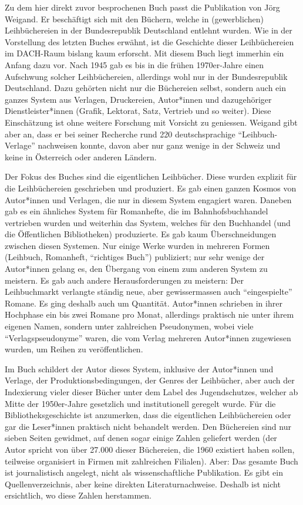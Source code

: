 \documentclass[a4paper,
fontsize=11pt,
oneside,
numbers=noperiodatend,
parskip=half-,
bibliography=totoc,
final
]{scrartcl}
\begin{document}
Zu dem hier direkt zuvor besprochenen Buch passt die Publikation von
Jörg Weigand. Er beschäftigt sich mit den Büchern, welche in
(gewerblichen) Leihbüchereien in der Bundesrepublik Deutschland entlehnt
wurden. Wie in der Vorstellung des letzten Buches erwähnt, ist die
Geschichte dieser Leihbüchereien im DACH-Raum bislang kaum erforscht.
Mit diesem Buch liegt immerhin ein Anfang dazu vor. Nach 1945 gab es bis
in die frühen 1970er-Jahre einen Aufschwung solcher Leihbüchereien,
allerdings wohl nur in der Bundesrepublik Deutschland. Dazu gehörten
nicht nur die Büchereien selbst, sondern auch ein ganzes System aus
Verlagen, Druckereien, Autor*innen und dazugehöriger Dienstleister*innen
(Grafik, Lektorat, Satz, Vertrieb und so weiter). Diese Einschätzung ist
ohne weitere Forschung mit Vorsicht zu geniessen. Weigand gibt aber an,
dass er bei seiner Recherche rund 220 deutschsprachige
\enquote{Leihbuch-Verlage} nachweisen konnte, davon aber nur ganz wenige
in der Schweiz und keine in Österreich oder anderen Ländern.

Der Fokus des Buches sind die eigentlichen Leihbücher. Diese wurden
explizit für die Leihbüchereien geschrieben und produziert. Es gab einen
ganzen Kosmos von Autor*innen und Verlagen, die nur in diesem System
engagiert waren. Daneben gab es ein ähnliches System für Romanhefte, die
im Bahnhofsbuchhandel vertrieben wurden und weiterhin das System,
welches für den Buchhandel (und die Öffentlichen Bibliotheken)
produzierte. Es gab kaum Überschneidungen zwischen diesen Systemen. Nur
einige Werke wurden in mehreren Formen (Leihbuch, Romanheft,
\enquote{richtiges Buch}) publiziert; nur sehr wenige der Autor*innen
gelang es, den Übergang von einem zum anderen System zu meistern. Es gab
auch andere Herausforderungen zu meistern: Der Leihbuchmarkt verlangte
ständig neue, aber gewissermassen auch \enquote{eingespielte} Romane. Es
ging deshalb auch um Quantität. Autor*innen schrieben in ihrer Hochphase
ein bis zwei Romane pro Monat, allerdings praktisch nie unter ihrem
eigenen Namen, sondern unter zahlreichen Pseudonymen, wobei viele
\enquote{Verlagspseudonyme} waren, die vom Verlag mehreren Autor*innen
zugewiesen wurden, um Reihen zu veröffentlichen.

Im Buch schildert der Autor dieses System, inklusive der Autor*innen und
Verlage, der Produktionsbedingungen, der Genres der Leihbücher, aber
auch der Indexierung vieler dieser Bücher unter dem Label des
Jugendschutzes, welcher ab Mitte der 1950er-Jahre gesetzlich und
institutionell geregelt wurde. Für die Bibliotheksgeschichte ist
anzumerken, dass die eigentlichen Leihbüchereien oder gar die
Leser*innen praktisch nicht behandelt werden. Den Büchereien sind nur
sieben Seiten gewidmet, auf denen sogar einige Zahlen geliefert werden
(der Autor spricht von über 27.000 dieser Büchereien, die 1960 existiert
haben sollen, teilweise organisiert in Firmen mit zahlreichen Filialen).
Aber: Das gesamte Buch ist journalistisch angelegt, nicht als
wissenschaftliche Publikation. Es gibt ein Quellenverzeichnis, aber
keine direkten Literaturnachweise. Deshalb ist nicht ersichtlich, wo
diese Zahlen herstammen.
\end{document}
